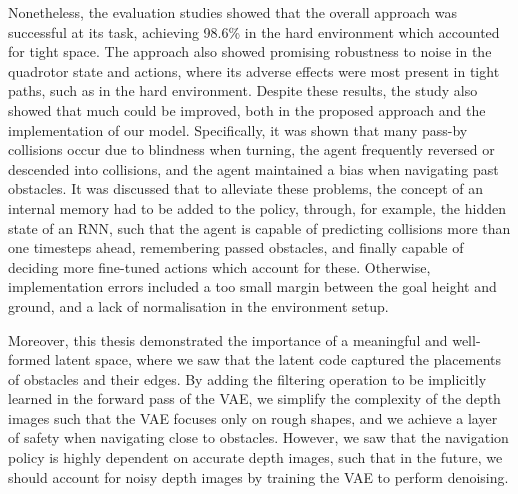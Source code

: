 Nonetheless, the evaluation studies showed that the overall approach was successful at its task, achieving 98.6\% in the hard environment which accounted for tight space. The approach also showed promising robustness to noise in the quadrotor state and actions, where its adverse effects were most present in tight paths, such as in the hard environment. Despite these results, the study also showed that much could be improved, both in the proposed approach and the implementation of our model. Specifically, it was shown that many pass-by collisions occur due to blindness when turning, the agent frequently reversed or descended into collisions, and the agent maintained a bias when navigating past obstacles.
It was discussed that to alleviate these problems, the concept of an internal memory had to be added to the policy, through, for example, the hidden state of an RNN, such that the agent is capable of predicting collisions more than one timesteps ahead, remembering passed obstacles, and finally capable of deciding more fine-tuned actions which account for these.
Otherwise, implementation errors included a too small margin between the goal height and ground, and a lack of normalisation in the environment setup. 

Moreover, this thesis demonstrated the importance of a meaningful and well-formed latent space, where we saw that the latent code captured the placements of obstacles and their edges. By adding the filtering operation to be implicitly learned in the forward pass of the VAE, we simplify the complexity of the depth images such that the VAE focuses only on rough shapes, and we achieve a layer of safety when navigating close to obstacles.
However, we saw that the navigation policy is highly dependent on accurate depth images, such that in the future, we should account for noisy depth images by training the VAE to perform denoising.
